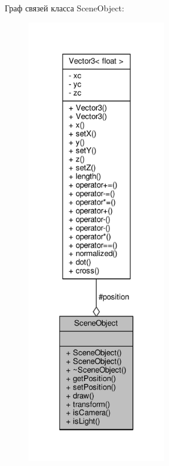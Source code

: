 Граф связей класса Scene\+Object\+:
\nopagebreak
\begin{figure}[H]
\begin{center}
\leavevmode
\includegraphics[height=550pt]{da/dcb/class_scene_object__coll__graph}
\end{center}
\end{figure}
